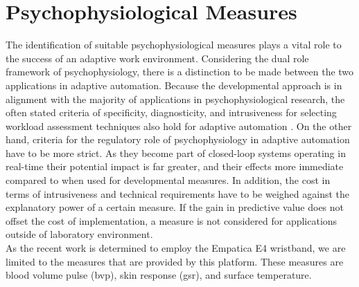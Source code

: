 \section{Psychophysiological Measures}
The identification of suitable psychophysiological measures plays a vital role to the success of an adaptive work environment. Considering the dual role framework of psychophysiology, there is a distinction to be made between the two applications in adaptive automation. Because the developmental approach is in alignment with the majority of applications in psychophysiological research, the often stated criteria of specificity, diagnosticity, and intrusiveness for selecting workload assessment techniques also hold for adaptive automation \cite{Byrne1996}. On the other hand, criteria for the regulatory role of psychophysiology in adaptive automation have to be more strict. As they become part of closed-loop systems operating in real-time their potential impact is far greater, and their effects more immediate compared to when used for developmental measures.  
In addition, the cost in terms of intrusiveness and technical requirements have to be weighed against the explanatory power of a certain measure. If the gain in predictive value does not offset the cost of implementation, a measure is not considered for applications outside of laboratory environment.\\
As the recent work is determined to employ the Empatica E4 wristband, we are limited to the measures that are provided by this platform. These measures are blood volume pulse (\gls{bvp}), skin response (\gls{gsr}), and surface temperature.
